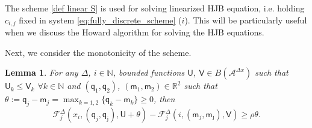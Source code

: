 \documentclass[11pt]{article}
\numberwithin{equation}{section}
\newtheorem{lemma}[theorem]{Lemma}
\newtheorem{proposition}[theorem]{Proposition}
\theoremstyle{Claim}
\newcommand{\R}{\mathbb{R}}
\newcommand{\N}{\mathbb{N}}
\newcommand{\mA}{\mathcal A}
\newcommand{\mT}{\mathcal T}
\def\bq{{\mathsf{q}}}
\def\bm{{\mathsf{m}}}
\def\sU{{\mathsf{U}}}
\def\sV{{\mathsf{V}}}
\def\bV{{\mathbf{V}}}
\def\bjm{{\bar{\jmath}}}
\newcommand{\bc}{\mathbf{c}}
\newcommand{\bU}{\mathbf{U}}
\theoremstyle{plain}
\newcommand{\D}{\Delta}
\newcommand{\Dx}{{\Delta x}}
\begin{document}
The scheme \eqref{def linear S} is used for solving linearized HJB equation, i.e. holding $c_{i,j}$ fixed in system \eqref{eq:fully_discrete_scheme} ($i$). This will be particularly useful when we discuss the Howard algorithm for solving the HJB equations. \par
Next, we consider the monotonicity of the scheme. 
\begin{lemma}\label{monotone_scheme}
For any  $\D$, $i\in\N$,
	bounded functions $\sU$, $\sV\in B(\mA^\Dx)$ such that $\sU_k\le \sV_k$  $\forall k\in\N$ and  $(\bq_1,\bq_2)$, $(\bm_1,\bm_2)\in\R^2$ such that $\displaystyle \theta:=\bq_j-\bm_j=\max_{k=1,2}\{\bq_k-\bm_k\}\ge 0$, then
\begin{equation}\label{S monotone}
\mathcal{F}^\D_j(x_i,(\bq_j,\bq_{\bar \jmath}), \mathsf{U}+\theta)-\mathcal{F}^\D_j(i,(\bm_j,\bm_{\bar \jmath}),\mathsf{V})\ge \rho\theta.
\end{equation}
\end{lemma}
\end{document}
